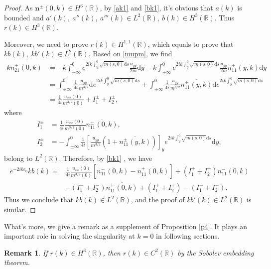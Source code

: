 \documentclass[11pt]{article}
\numberwithin{equation}{section}
\newtheorem{remark}{Remark}
\begin{document}
\begin{proof}  As $\textbf{n}^{\pm}(0,k)\in H^3(\mathbb{R})$, by \eqref{ak1} and \eqref{bk1}, it's obvious that $a(k)$ is bounded and $a'(k),\ a''(k),\ a'''(k)\in L^2(\mathbb{R}),\ b(k)\in H^3(\mathbb{R})$. Thus $r(k)\in H^3(\mathbb{R})$.

Moreover, we need to prove $r(k)\in H^{1,1}(\mathbb{R})$, which equals to prove that $k{b(k)},\ k{b'(k)}\in L^2(\mathbb{R})$. Based on \eqref{mupm}, we find
\begin{equation*}
\begin{aligned}
k\overline{n^{\pm}_{21}(0,k)}&=-k\int_{\pm\infty}^0e^{2ik\int_y^0\sqrt{m(s,0)}\mathrm{d}s}\frac{u_{yy}}{2m}\mathrm{d}y-
k\int_{\pm\infty}^0e^{2ik\int_y^0\sqrt{m(s,0)}\mathrm{d}s}\frac{u_{yy}}{2m}\overline{n_{11}^{\pm}(y,k)}\mathrm{d}y\\
&=\int_{\pm\infty}^0\frac{1}{4i}\frac{u_{yy}}{m^{3/2}}\mathrm{d}e^{2ik\int_y^0\sqrt{m(s,0)}\mathrm{d}s}+\int_{\pm\infty}^0\frac{1}{4i}\frac{u_{yy}}{m^{3/2}}\overline{n_{11}^{\pm}(y,k)}\mathrm{d}e^{2ik\int_y^0\sqrt{m(s,0)}\mathrm{d}s}\\
&=\frac{1}{4i}\frac{u_{xx}(0)}{m^{3/2}(0)}+I_1^{\pm}+I_2^{\pm},
\end{aligned}
\end{equation*}
where
\begin{align*}
I_1^{\pm}&=\frac{1}{4i}\frac{u_{xx}(0)}{m^{3/2}(0)}\overline{n_{11}^{\pm}(0,k)},\\
I_2^{\pm}&=-\int_{\pm\infty}^0\frac{1}{4i}\left[\frac{u_{yy}}{m^{3/2}}\left(1+\overline{n_{11}^{\pm}(y,k)}\right)\right]_ye^{2ik\int_y^0\sqrt{m(s,0)}\mathrm{d}s}\mathrm{d}y,
\end{align*}
belong to $L^2(\mathbb{R})$.
Therefore, by \eqref{bk1} , we have
\begin{equation*}
\begin{aligned}
e^{-2ikc_0}kb(k)=&\frac{1}{4i}\frac{u_{xx}(0)}{m^{3/2}(0)}\left[\overline{n^-_{11}(0,k)}-\overline{n^+_{11}(0,k)}\right]+(I_1^{+}+I_2^{+})\overline{n^-_{11}(0,k)}\\
&-(I_1^{-}+I_2^{-})\overline{n^+_{11}(0,k)}+(I_1^{+}+I_2^{+})-(I_1^{-}+I_2^{-}).
\end{aligned}
\end{equation*}
Thus we conclude that $kb(k)\in L^2(\mathbb{R})$, and the proof of $kb'(k) \in L^2(\mathbb{R})$ is similar.
\end{proof}



What's more, we give a remark as a supplement of Proposition \ref{p4}. It plays an important role in solving the singularity at $k=0$ in following sections.
\begin{remark}\label{r1}
If  $r(k)\in H^3(\mathbb{R})$, then  $r(k)\in C^{2}(\mathbb{R})$  by the Sobolev  embedding theorem.
\end{remark}
\end{document}
